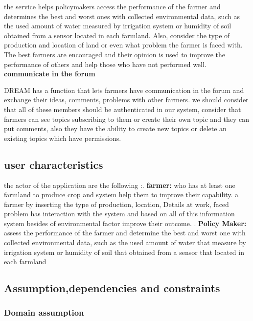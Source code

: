 the service helps policymakers access the performance of the farmer and determines the best and worst ones with collected environmental data, such as the used amount of water measured by irrigation system or humidity of soil obtained from a sensor located in each farmland. Also, consider the type of production and location of land or even what problem the farmer is faced with. The best farmers are encouraged and their opinion is used to improve the performance of others and help those who have not performed well. 
 \newline
 \newline
\textbf{communicate in the forum}

DREAM has a function that lets farmers have communication in the forum and exchange their ideas, comments, problems with other farmers. we should consider that all of these members should be authenticated in our system, consider that farmers can see topics subscribing to them or create their own topic and they can put comments, also they have the ability to create new topics or delete an existing topics which have permissions.

\pagebreak
\subsection{user characteristics}
the actor of the application  are the following :\newline{}. \textbf{farmer:} who has at least one farmland to produce crop and system help them to improve their capability. a farmer by inserting the type of production, location, Details at work, faced problem has interaction with the system and based on all of this information system besides of environmental factor improve their outcome.\newline
 . \textbf{Policy Maker:}  assess the performance of the farmer and determine the best and worst one with collected environmental data, such as the used amount of water that measure by irrigation system or humidity of soil that obtained from a sensor that located in each farmland  



\subsection{Assumption,dependencies and constraints}
\subsubsection{Domain assumption}

